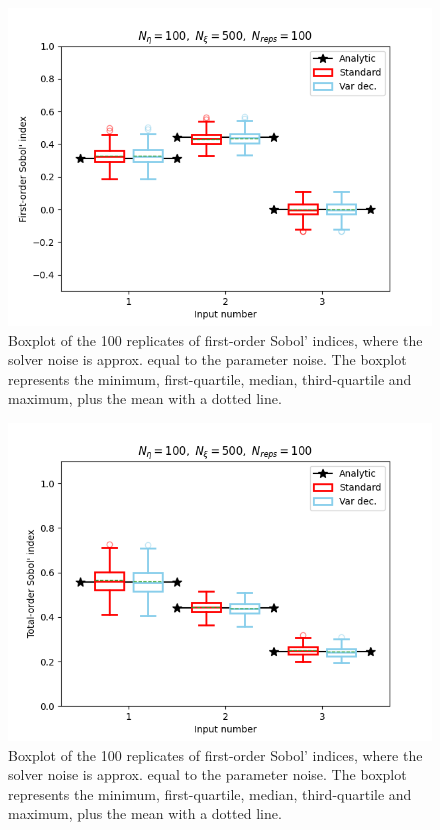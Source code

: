 \begin{figure}
    \centering
    \includegraphics{figures/medium_c/si_eta100_xi500.png}
    \caption{Boxplot of the 100 replicates of first-order Sobol’ indices, where the solver noise is approx. equal to the parameter noise. The boxplot represents the minimum, first-quartile, median, third-quartile and maximum, plus the mean with a dotted line.}
    \label{fig:mediumc-eta100-si}
\end{figure}
\begin{figure}
    \centering
    \includegraphics{figures/medium_c/ti_eta100_xi500.png}
    \caption{Boxplot of the 100 replicates of first-order Sobol’ indices, where the solver noise is approx. equal to the parameter noise. The boxplot represents the minimum, first-quartile, median, third-quartile and maximum, plus the mean with a dotted line.}
    \label{fig:mediumc-eta100-ti}
\end{figure}

